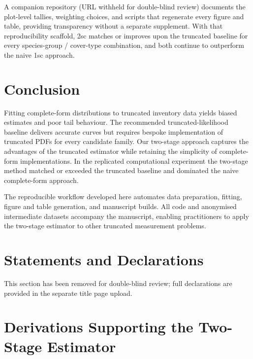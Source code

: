\documentclass[12pt]{article}
\begin{document}
A companion repository (URL withheld for double-blind review) documents the plot-level tallies, weighting choices, and scripts that regenerate every figure and table, providing transparency without a separate supplement. With that reproducibility scaffold, 2sc matches or improves upon the truncated baseline for every species-group / cover-type combination, and both continue to outperform the naive 1sc approach.

\section{Conclusion}

\label{sec:conclusion}

Fitting complete-form distributions to truncated inventory data yields biased estimates and poor tail behaviour. The recommended truncated-likelihood baseline delivers accurate curves but requires bespoke implementation of truncated PDFs for every candidate family. Our two-stage approach captures the advantages of the truncated estimator while retaining the simplicity of complete-form implementations. In the replicated computational experiment the two-stage method matched or exceeded the truncated baseline and dominated the naive complete-form approach.

The reproducible workflow developed here automates data preparation, fitting, figure and table generation, and manuscript builds. All code and anonymised intermediate datasets accompany the manuscript, enabling practitioners to apply the two-stage estimator to other truncated measurement problems.


\section*{Statements and Declarations}
This section has been removed for double-blind review; full declarations are provided in the separate title page upload.

\appendix
\section{Derivations Supporting the Two-Stage Estimator}
\end{document}
